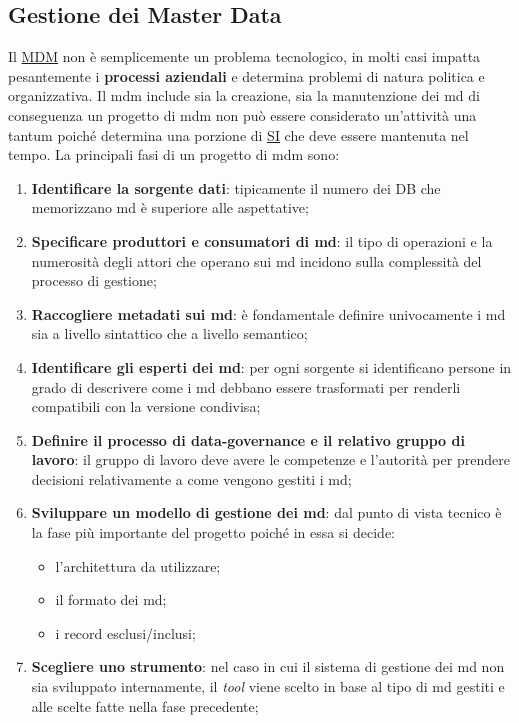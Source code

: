 \subsection{Gestione dei Master Data}\label{sub:db_gestione_dei_master_data} %
Il \hyperref[def:mdm]{MDM} non è semplicemente un problema tecnologico, in molti casi impatta pesantemente i \textbf{processi aziendali} e determina problemi di natura politica e organizzativa.
Il \ac{mdm} include sia la creazione, sia la manutenzione dei \ac{md} di conseguenza un progetto di \ac{mdm} non può essere considerato un'attività una tantum poiché determina una porzione di \hyperref[sub:il_sistema_informativo]{SI} che deve essere mantenuta nel tempo.
\emptyln{}
La principali fasi di un progetto di \ac{mdm} sono:
\begin{enumerate}
    \item \textbf{Identificare la sorgente dati}: tipicamente il numero dei DB che memorizzano \ac{md} è superiore alle aspettative;
    \item \textbf{Specificare produttori e consumatori di \ac{md}}: il tipo di operazioni e la numerosità degli attori che operano sui \ac{md} incidono sulla complessità del processo di gestione;
    \item \textbf{Raccogliere metadati sui \ac{md}}: è fondamentale definire univocamente i \ac{md} sia a livello sintattico che a livello semantico;
    \item \textbf{Identificare gli esperti dei \ac{md}}: per ogni sorgente si identificano persone in grado di descrivere come i \ac{md} debbano essere trasformati per renderli compatibili con la versione condivisa;
    \item \textbf{Definire il processo di data-governance e il relativo gruppo di lavoro}: il gruppo di lavoro deve avere le competenze e l'autorità per prendere decisioni relativamente a come vengono gestiti i \ac{md};
    \item \textbf{Sviluppare un modello di gestione dei \ac{md}}: dal punto di vista tecnico è la fase più importante del progetto poiché in essa si decide:
        \begin{itemize}
            \item l'architettura da utilizzare;
            \item il formato dei \ac{md};
            \item i record esclusi/inclusi;
        \end{itemize}
    \item \textbf{Scegliere uno strumento}: nel caso in cui il sistema di gestione dei \ac{md} non sia sviluppato internamente, il \textit{tool} viene scelto in base al tipo di \ac{md} gestiti e alle scelte fatte nella fase precedente;

\end{enumerate}
